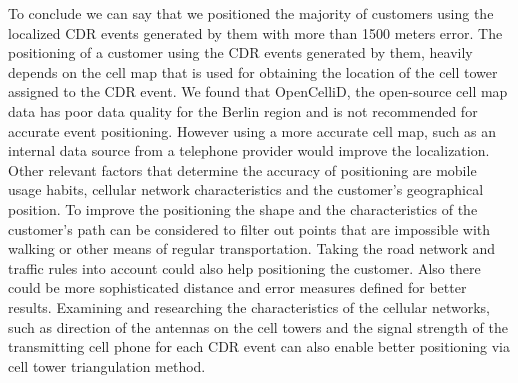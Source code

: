 To conclude we can say that we positioned the majority of customers using the localized CDR events generated by them with more than 1500 meters error.
The positioning of a customer using the CDR events generated by them, heavily depends on the cell map that is used for obtaining the location of the cell tower assigned to the CDR event. 
We found that OpenCelliD, the open-source cell map data has poor data quality for the Berlin region and is not recommended for accurate event positioning. 
However using a more accurate cell map, such as an internal data source from a telephone provider would improve the localization.
Other relevant factors that determine the accuracy of positioning are mobile usage habits, cellular network characteristics and the customer's geographical position.
To improve the positioning the shape and the characteristics of the customer's path can be considered to filter out points that are impossible with walking or other means of regular transportation. Taking the road network and traffic rules into account could also help positioning the customer. Also there could be more sophisticated distance and error measures defined for better results.
Examining and researching the characteristics of the cellular networks, such as direction of the antennas on the cell towers and the signal strength of the transmitting cell phone for each CDR event can also enable better positioning via cell tower triangulation method. 
